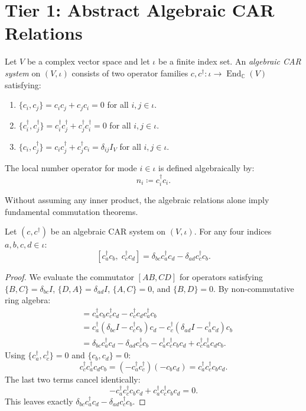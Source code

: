 \section{Tier 1: Abstract Algebraic CAR Relations}

\begin{definition}
Let $V$ be a complex vector space and let $\iota$ be a finite index set. An \emph{algebraic CAR system} on $(V, \iota)$ consists of two operator families $c, c^\dagger : \iota \to \operatorname{End}_{\mathbb{C}}(V)$ satisfying:
\begin{enumerate}
    \item $\{c_i, c_j\} = c_i c_j + c_j c_i = 0$ for all $i, j \in \iota$.
    \item $\{c_i^\dagger, c_j^\dagger\} = c_i^\dagger c_j^\dagger + c_j^\dagger c_i^\dagger = 0$ for all $i, j \in \iota$.
    \item $\{c_i, c_j^\dagger\} = c_i c_j^\dagger + c_j^\dagger c_i = \delta_{ij} I_V$ for all $i, j \in \iota$.
\end{enumerate}
The local number operator for mode $i \in \iota$ is defined algebraically by:
\begin{equation}
n_i \coloneqq c_i^\dagger c_i.
\end{equation}
\end{definition}

Without assuming any inner product, the algebraic relations alone imply fundamental commutation theorems.

\begin{theorem}
\label{thm:app_bilinear_commutator}
Let $(c, c^\dagger)$ be an algebraic CAR system on $(V, \iota)$. For any four indices $a, b, c, d \in \iota$:
\begin{equation}
\left[ c_a^\dagger c_b, \; c_c^\dagger c_d \right] = \delta_{bc} c_a^\dagger c_d - \delta_{ad} c_c^\dagger c_b.
\end{equation}
\end{theorem}

\begin{proof}
We evaluate the commutator $[A B, C D]$ for operators satisfying $\{B, C\} = \delta_{bc} I$, $\{D, A\} = \delta_{ad} I$, $\{A, C\} = 0$, and $\{B, D\} = 0$.
By non-commutative ring algebra:
\begin{align*}
[c_a^\dagger c_b, \; c_c^\dagger c_d] &= c_a^\dagger c_b c_c^\dagger c_d - c_c^\dagger c_d c_a^\dagger c_b \\
&= c_a^\dagger (\delta_{bc} I - c_c^\dagger c_b) c_d - c_c^\dagger (\delta_{ad} I - c_a^\dagger c_d) c_b \\
&= \delta_{bc} c_a^\dagger c_d - \delta_{ad} c_c^\dagger c_b - c_a^\dagger c_c^\dagger c_b c_d + c_c^\dagger c_a^\dagger c_d c_b.
\end{align*}
Using $\{c_a^\dagger, c_c^\dagger\} = 0$ and $\{c_b, c_d\} = 0$:
\[
c_c^\dagger c_a^\dagger c_d c_b = (- c_a^\dagger c_c^\dagger) (- c_b c_d) = c_a^\dagger c_c^\dagger c_b c_d.
\]
The last two terms cancel identically:
\[
- c_a^\dagger c_c^\dagger c_b c_d + c_a^\dagger c_c^\dagger c_b c_d = 0.
\]
This leaves exactly $\delta_{bc} c_a^\dagger c_d - \delta_{ad} c_c^\dagger c_b$.
\end{proof}


